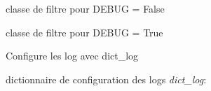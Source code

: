 \documentclass[letterpaper,10pt,french]{sphinxmanual}
\begin{document}
\begin{fulllineitems}
\label{log:log.RequireDebugFalse}
classe de filtre pour DEBUG = False

\end{fulllineitems}


\begin{fulllineitems}
\label{log:log.RequireDebugTrue}
classe de filtre pour DEBUG = True

\end{fulllineitems}


\begin{fulllineitems}
\label{log:log.configure}
Configure les log avec dict\_log

\end{fulllineitems}


dictionnaire de configuration des logs \emph{dict\_log}:
\end{document}
